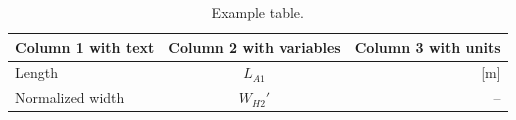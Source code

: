 \begin{table}[h!]\scriptsize\begin{center}\caption{Example table.}
\begin{tabular}{|l|c|r|}\hline
\textbf{Column 1 with text} &\textbf{ Column 2 with variables} &\textbf{Column 3 with units} \\ 
\hline 
Length  & $L_{A\text{1}}$& [m]\\ \hline
Normalized width   & $W_{H\text{2}}'$& --\\
		 

\hline\end{tabular}\label{tab:exampleTable}\end{center}\end{table}
